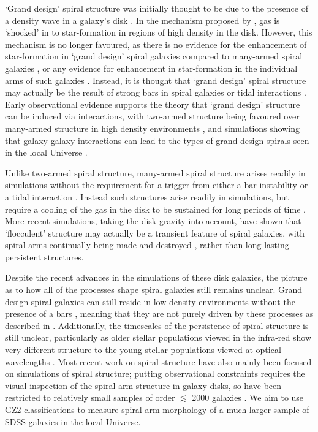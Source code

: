 \documentclass[useAMS,usenatbib]{mn2e}
\begin{document}
`Grand design' spiral structure was initially thought to be due to the presence of a density wave in a galaxy's disk \citep{Lindblad_63,Lin_64}. In the mechanism proposed by \citet{Lin_64}, gas is `shocked' in to star-formation in regions of high density in the disk. However, this mechanism is no longer favoured, as there is no evidence for the enhancement of star-formation in `grand design' spiral galaxies compared to many-armed spiral galaxies \citep{Romanishin_85,EE_86}, or any evidence for enhancement in star-formation in the individual arms of such galaxies \citep{Foyle_11,Choi_15}. Instead, it is thought that `grand design' spiral structure may actually be the result of strong bars in spiral galaxies or tidal interactions \citep{Kormendy_79}. Early observational evidence supports the theory that `grand design' structure can be induced via interactions, with two-armed structure being favoured over many-armed structure in high density environments \citep{EE_82,EE_87,Ann_14}, and simulations showing that galaxy-galaxy interactions can lead to the types of grand design spirals seen in the local Universe \citep{Dobbs_10}. 

Unlike two-armed spiral structure, many-armed spiral structure arises readily in simulations without the requirement for a trigger from either a bar instability or a tidal interaction \citep{James_78,Sellwood_84}. Instead such structures arise readily in simulations, but require a cooling of the gas in the disk to be sustained for long periods of time \citep{Carlberg_85}. More recent simulations, taking the disk gravity into account, have shown that `flocculent' structure may actually be a transient feature of spiral galaxies, with spiral arms continually being made and destroyed \citep{Bottema_03,Grand_12b,Baba_09,Baba_13,Donghia_13}, rather than long-lasting persistent structures.

Despite the recent advances in the simulations of these disk galaxies, the picture as to how all of the processes shape spiral galaxies still remains unclear. Grand design spiral galaxies can still reside in low density environments without the presence of a bars  \citep{EE_82}, meaning that they are not purely driven by these processes as described in \citep{Kormendy_79}. Additionally, the timescales of the persistence of spiral structure is still unclear, particularly as older stellar populations viewed in the infra-red show very different structure to the young stellar populations viewed at optical wavelengths \citep{Block_91,Block_94,Thornley_96}. Most recent work on spiral structure have also mainly been focused on simulations of spiral structure; putting observational constraints requires the visual inspection of the spiral arm structure in galaxy disks, so have been restricted to relatively small samples of order $\lesssim$ 2000 galaxies \citep{EE_82,EE_89,Ann_13}. We aim to use GZ2 classifications to measure spiral arm morphology of a much larger sample of SDSS galaxies in the local Universe.
\end{document}
